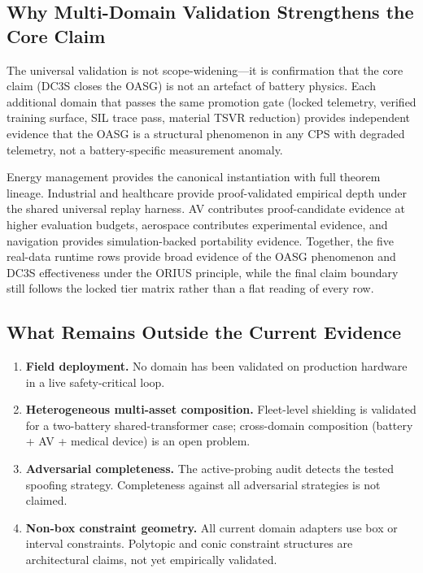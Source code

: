 \subsection{Why Multi-Domain Validation Strengthens the Core Claim}

The universal validation is not scope-widening---it is confirmation that
the core claim (DC3S closes the OASG) is not an artefact of battery physics.
Each additional domain that passes the same promotion gate (locked telemetry,
verified training surface, SIL trace pass, material TSVR reduction) provides
independent evidence that the OASG is a structural phenomenon in any CPS with
degraded telemetry, not a battery-specific measurement anomaly.

Energy management provides the canonical instantiation with full theorem lineage.
Industrial and healthcare provide proof-validated empirical depth under the
shared universal replay harness.  AV contributes proof-candidate evidence at
higher evaluation budgets, aerospace contributes experimental evidence, and
navigation provides simulation-backed
portability evidence.  Together, the five real-data runtime rows provide
broad evidence of the OASG phenomenon and DC3S effectiveness under the ORIUS
principle, while the final claim boundary still follows the locked tier
matrix rather than a flat reading of every row.

\subsection{What Remains Outside the Current Evidence}

\begin{enumerate}
  \item \textbf{Field deployment.}  No domain has been validated on production
    hardware in a live safety-critical loop.
  \item \textbf{Heterogeneous multi-asset composition.}  Fleet-level shielding
    is validated for a two-battery shared-transformer case; cross-domain
    composition (battery + AV + medical device) is an open problem.
  \item \textbf{Adversarial completeness.}  The active-probing audit detects
    the tested spoofing strategy.  Completeness against all adversarial
    strategies is not claimed.
  \item \textbf{Non-box constraint geometry.}  All current domain adapters
    use box or interval constraints.  Polytopic and conic constraint
    structures are architectural claims, not yet empirically validated.
\end{enumerate}

